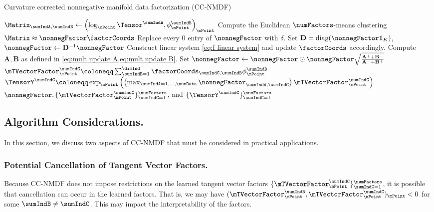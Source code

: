 \begin{algorithm}[t!]
\caption{Curvature corrected nonnegative manifold data factorization (CC-NMDF)}
\label{alg:CC-NMDF}
\begin{algorithmic}[1]
\State $\Matrix_{\sumIndA, \sumIndB} \gets \left ( \log_\mPoint \Tensor^\sumIndA, \phi_\mPoint^\sumIndB \right )_\mPoint$
\EndFor
\EndFor
\State Compute the Euclidean $\numFactors$-means clustering $\Matrix \approx \nonnegFactor \factorCoords$
\State Replace every 0 entry of $\nonnegFactor$ with $\delta$.
\State Set $\mathbf{D} = \text{diag}(\nonnegFactor \mathbf{1}_K)$,  $\nonnegFactor \gets \mathbf{D}^{-1}\nonnegFactor$
\State Construct linear system \eqref{eq:f linear system} and update $\factorCoords$ accordingly.
\State Compute $\mathbf{A}, \mathbf{B}$ as defined in \cref{eq:mult update A,eq:mult update B}.
\State Set $\nonnegFactor \gets \nonnegFactor \odot \nonnegFactor \sqrt{\frac{\mathbf{A}^+ + \mathbf{B}^-}{\mathbf{A}^- + \mathbf{B}^+}}$
\EndFor
\EndFor
{}
\State $\mTVectorFactor_\mPoint^\sumIndC \coloneqq \sum_{\sumIndB=1}^\dimInd \factorCoords_{\sumIndC, \sumIndB}\phi_{\mPoint}^\sumIndB$
\State $\TensorY^\sumIndC \coloneqq \exp_\mPoint \left ( \left(\max_{\sumIndA = 1, \dots, \numData} \nonnegFactor_{\sumIndA, \sumIndC}\right) \mTVectorFactor_\mPoint^\sumIndC \right )$
\EndFor
\State \Return $\nonnegFactor, \{\mTVectorFactor_\mPoint^\sumIndC\}_{\sumIndC=1}^\numFactors$, and $\{\TensorY^\sumIndC\}_{\sumIndC=1}^\numFactors$
\end{algorithmic}
\end{algorithm}


\subsection{Algorithm Considerations.}
\label{sec:algorithm-considerations}
In this section, we discuss two aspects of CC-NMDF that must be considered in practical applications. 
\subsubsection{Potential Cancellation of Tangent Vector Factors.} Because CC-NMDF does not impose restrictions on the learned tangent vector factors $\{\mTVectorFactor_\mPoint^\sumIndC\}_{\sumIndC=1}^\numFactors$, it is possible that cancellation can occur in the learned factors. That is, we may have $(\mTVectorFactor_\mPoint^\sumIndB, \mTVectorFactor_\mPoint^\sumIndC)_\mPoint < 0$ for some $\sumIndB \neq \sumIndC$. This may impact the interpretability of the factors. 

